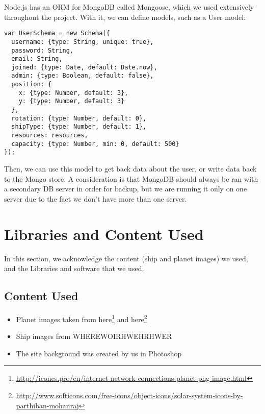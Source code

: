 \documentclass[a4paper,11pt]{article}
\begin{document}
			Node.js has an ORM for MongoDB called Mongoose, which we used extensively throughout the project. With it, we can define models, such as a User model:
			
			\begin{verbatim}
var UserSchema = new Schema({
  username: {type: String, unique: true},
  password: String,
  email: String,
  joined: {type: Date, default: Date.now},
  admin: {type: Boolean, default: false},
  position: {
    x: {type: Number, default: 3},
    y: {type: Number, default: 3}
  },
  rotation: {type: Number, default: 0},
  shipType: {type: Number, default: 1},
  resources: resources,
  capacity: {type: Number, min: 0, default: 500}
});
			\end{verbatim}
		
			Then, we can use this model to get back data about the user, or write data back to the Mongo store.
			A consideration is that MongoDB should always be ran with a secondary DB server in order for backup, but we are running it only on one server due to the fact we don't have more than one server.
			
	
	\section{Libraries and Content Used}
		In this section, we acknowledge the content (ship and planet images) we used, and the Libraries and software that we used.
		
		\subsection{Content Used}
			\begin{itemize}
				\item Planet images taken from here\footnote{\url{http://icones.pro/en/internet-network-connections-planet-png-image.html}} and here\footnote{\url{http://www.softicons.com/free-icons/object-icons/solar-system-icons-by-parthiban-mohanraj}}
				\item Ship images from WHEREWOIRHWEHRHWER
				\item The site background was created by us in Photoshop
			\end{itemize}
			
\end{document}
